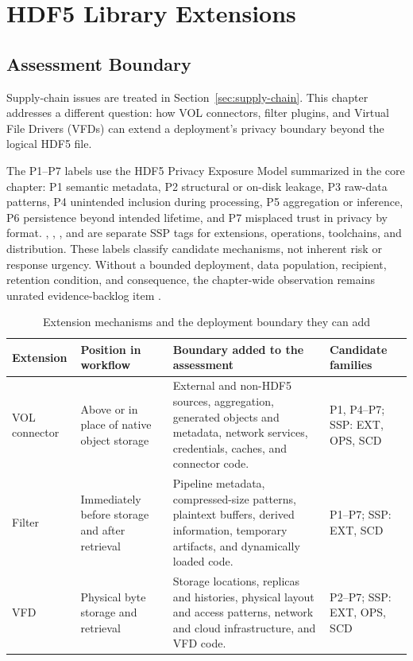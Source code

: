 \documentclass[../main.tex]{subfiles}
\begin{document}
\section{HDF5 Library Extensions}
\label{sec:extensions}

\subsection{Assessment Boundary}

Supply-chain issues are treated in Section~\ref{sec:supply-chain}. This
chapter addresses a different question: how VOL connectors, filter plugins,
and Virtual File Drivers (VFDs) can extend a deployment's privacy boundary
beyond the logical HDF5 file.

The P1--P7 labels use the HDF5 Privacy Exposure Model summarized in the core
chapter: P1 semantic metadata, P2 structural or on-disk leakage, P3 raw-data
patterns, P4 unintended inclusion during processing, P5 aggregation or
inference, P6 persistence beyond intended lifetime, and P7 misplaced trust in
privacy by format. , , , and  are
separate SSP tags for extensions, operations, toolchains, and distribution.
These labels classify candidate mechanisms, not inherent risk or response
urgency. Without a bounded deployment, data population, recipient, retention
condition, and consequence, the chapter-wide observation remains unrated
evidence-backlog item .

\begin{table}[htbp]
\centering
\small
\setlength{\tabcolsep}{3pt}
\renewcommand{\arraystretch}{1.12}
\begin{tabularx}{\textwidth}{@{}p{}p{}X p{}@{}}
\hline
\textbf{Extension} & \textbf{Position in workflow} &
\textbf{Boundary added to the assessment} & \textbf{Candidate families} \\
\hline
VOL connector & Above or in place of native object storage &
External and non-HDF5 sources, aggregation, generated objects and metadata,
network services, credentials, caches, and connector code. &
P1, P4--P7; SSP: EXT, OPS, SCD \\
Filter & Immediately before storage and after retrieval &
Pipeline metadata, compressed-size patterns, plaintext buffers, derived
information, temporary artifacts, and dynamically loaded code. &
P1--P7; SSP: EXT, SCD \\
VFD & Physical byte storage and retrieval &
Storage locations, replicas and histories, physical layout and access
patterns, network and cloud infrastructure, and VFD code. &
P2--P7; SSP: EXT, OPS, SCD \\
\hline
\end{tabularx}
\caption{Extension mechanisms and the deployment boundary they can add}
\label{tab:extension-boundary}
\end{table}
\end{document}
